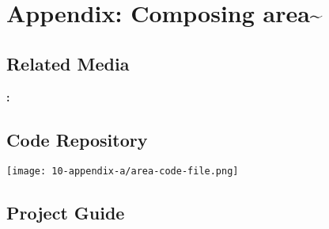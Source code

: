 \chapter{Appendix: Composing area\textasciitilde{}}

\section{Related Media}
\noindent \textbf{ :}        \url{}

\section{Code Repository}
\texttt{[image: 10-appendix-a/area-code-file.png]}

\section{Project Guide}